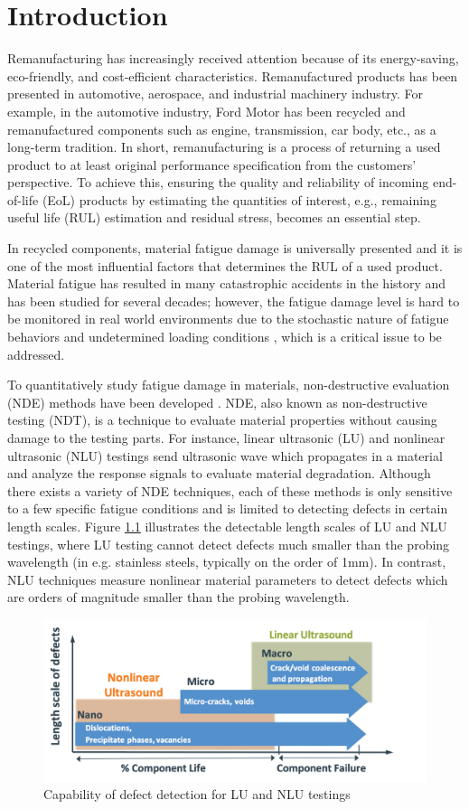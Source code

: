 \chapter{Introduction}
\label{chap: intro}
Remanufacturing has increasingly received attention because of its energy-saving, eco-friendly, and cost-efficient characteristics. Remanufactured products has been presented in automotive, aerospace, and industrial machinery industry. For example, in the automotive industry, Ford Motor has been recycled and remanufactured components such as engine, transmission, car body, etc., as a long-term tradition. In short, remanufacturing is a process of returning a used product to at least original performance specification from the customers’ perspective. To achieve this, ensuring the quality and reliability of incoming end-of-life (EoL) products by estimating the quantities of interest, e.g., remaining useful life (RUL) estimation and residual stress, becomes an essential step.

In recycled components, material fatigue damage is universally presented and it is one of the most influential factors that determines the RUL of a used product. Material fatigue has resulted in many catastrophic accidents in the history and has been studied for several decades; however, the fatigue damage level is hard to be monitored in real world environments due to the stochastic nature of fatigue behaviors and undetermined loading conditions \cite{fatigue-review-Santecchia2016}, which is a critical issue to be addressed.

To quantitatively study fatigue damage in materials, non-destructive evaluation (NDE) methods have been developed \cite{nde-review-WISNER2020}. NDE, also known as non-destructive testing (NDT), is a technique to evaluate material properties without causing damage to the testing parts. For instance, linear ultrasonic (LU) and nonlinear ultrasonic (NLU) testings send ultrasonic wave which propagates in a material and analyze the response signals to evaluate material degradation. Although there exists a variety of NDE techniques, each of these methods is only sensitive to a few specific fatigue conditions and is limited to detecting defects in certain length scales. Figure \ref{fig: lu nlu length scales} illustrates the detectable length scales of LU and NLU testings, where LU testing cannot detect defects much smaller than the probing wavelength (in e.g. stainless steels, typically on the order of 1mm). In contrast, NLU techniques measure nonlinear material parameters to detect defects which are orders of magnitude smaller than the probing wavelength.

\begin{figure}[tb]
    \includegraphics[width=\linewidth]{fig/lu_nlu_length_scales.png}
    \caption{Capability of defect detection for LU and NLU testings}
    \label{fig: lu nlu length scales}
\end{figure}